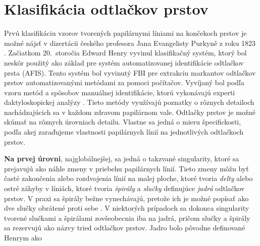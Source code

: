   \section{Klasifikácia odtlačkov prstov} \label{sec:klasifikacia_odtl}
  Prvú klasifikáciu vzorov tvorených papilárnymi líniami na končekoch prstov je možné nájsť v dizertácii českého profesora Jana Evangelisty Purkyně
  z roku 1823 \cite{FingerprintSrcBook}. Začiatkom 20.~storočia Edward Henry vyvinul klasifikačný systém, ktorý bol neskôr použitý ako základ pre systém
  automatizovanej identifikácie odtlačkov prsta (AFIS). Tento systém bol vyvinutý FBI pre extrakciu markantov odtlačkov prstov automatizovanými metódami
  za pomoci počítačov. Vyvíjaný bol podľa vzoru metód a spôsobov manuálnej identifikácie, ktorú vykonávajú experti daktyloskopickej analýzy
  \cite{FingerprintSrcBook}. Tieto metódy využívajú poznatky o rôznych detailoch nachádzajúcich sa v každom zdravom papilárnom vale.
  Odtlačky prstov je možné skúmať na rôznych úrovniach detailu. Vlastne sa jedná o mieru špecifickosti, podľa akej zaraďujeme vlastnosti
  papilárnych línií na jednotlivých odtlačkoch prstov.

  \textbf{Na prvej úrovni}, najglobálnejšej, sa jedná o takzvané singularity, ktoré sa prejavujú ako náhle zmeny v priebehu papilárnych línií. Tieto 
  zmeny môžu byť časté zakončenia alebo rozdvojenia línií na malej ploche, ktoré tvoria \emph{delty} alebo ostré záhyby v líniách, 
  ktoré tvoria \emph{špirály} a \emph{slučky} definujúce \emph{jadrá} odtlačkov prstov. V praxi sa špirály bežne vynechávajú, pretože ich je možné popísať
  ako dve slučky obrátené proti sebe \cite{Handbook}. V niektorých prípadoch \cite{Drahansky, FingerprintSrcBook} sa dokonca singularity tvorené slučkami
  a špirálami zovšeobecnia iba na jadrá, pričom slučky a špirály sa rezervujú ako názvy tried odtlačkov prstov. Jadro bolo pôvodne definované Henrym \cite{Henry}
  ako 

